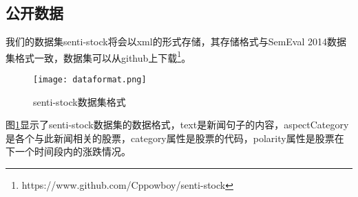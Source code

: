 \subsection{公开数据}

我们的数据集senti-stock将会以xml的形式存储，其存储格式与SemEval 2014数据集格式一致\cite{pontiki2014semeval-2014}，数据集可以从github上下载\footnote{https://www.github.com/Cppowboy/senti-stock}。

\begin{figure}[ht]
	\centering
	\texttt{[image: dataformat.png]}
	\caption{senti-stock数据集格式}
	\label{fig:dataformat}
\end{figure}
图\ref{fig:dataformat}显示了senti-stock数据集的数据格式，text是新闻句子的内容，aspectCategory是各个与此新闻相关的股票，category属性是股票的代码，polarity属性是股票在下一个时间段内的涨跌情况。
